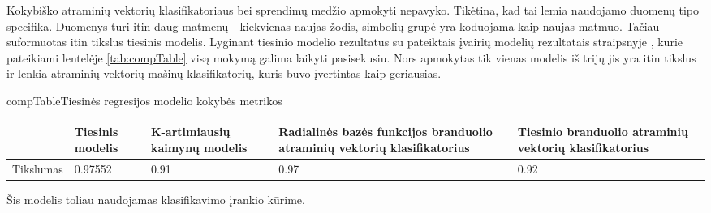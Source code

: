 
Kokybiško atraminių vektorių klasifikatoriaus bei sprendimų medžio apmokyti nepavyko.
Tikėtina, kad tai lemia naudojamo duomenų tipo specifika. Duomenys turi itin daug
matmenų - kiekvienas naujas žodis, simbolių grupė yra koduojama kaip naujas matmuo.
Tačiau suformuotas itin tikslus tiesinis modelis. Lyginant tiesinio modelio rezultatus
su pateiktais įvairių modelių rezultatais straipsnyje \cite{comp}, kurie pateikiami
lentelėje \vref{tab:compTable} visą mokymą galima laikyti pasisekusiu. Nors apmokytas
tik vienas modelis iš trijų jis yra itin tikslus ir lenkia atraminių vektorių mašinų klasifikatorių, kuris buvo įvertintas kaip geriausias.

\begin{ktutable}{compTable}{Tiesinės regresijos modelio kokybės metrikos}
    \begin{tabular}{|l|p{3cm}|p{3cm}|p{3cm}|p{3cm}|}
    \hline
                             & Tiesinis modelis  &  K-artimiausių kaimynų modelis  &  Radialinės bazės funkcijos branduolio atraminių vektorių klasifikatorius  &  Tiesinio branduolio atraminių vektorių klasifikatorius \\ \hline
               Tikslumas     & 0.97552           & 0.91   & 0.97  &  0.92         \\ \hline
    \end{tabular}
\end{ktutable}

Šis modelis toliau naudojamas klasifikavimo įrankio kūrime.
